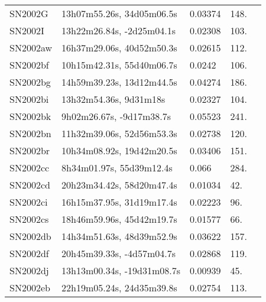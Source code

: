 \begin{longtable}{lllll}
          SN2002G &      13h07m55.26s, 34d05m06.5s &  0.03374 &           148. &    \citet{1995ApJS...99..391H} \\
          SN2002I &      13h22m26.84s, -2d25m04.1s &  0.02308 &           103. &    \citet{2006ApJS..167....1B} \\
         SN2002aw &      16h37m29.06s, 40d52m50.3s &  0.02615 &           112. &    \citet{2002AJ....124.1266R} \\
         SN2002bf &      10h15m42.31s, 55d40m06.7s &   0.0242 &           106. &    \citet{1999PASP..111..438F} \\
         SN2002bg &      14h59m39.23s, 13d12m44.5s &  0.04274 &           186. &    \citet{1996AJ....111..696K} \\
         SN2002bi &         13h32m54.36s, 9d31m18s &  0.02327 &           104. &    \citet{2008AJ....136..713K} \\
         SN2002bk &       9h02m26.67s, -9d17m38.7s &  0.05523 &           241. &    \citet{20096dF...C...0000J} \\
         SN2002bn &      11h32m39.06s, 52d56m53.3s &  0.02738 &           120. &    \citet{1991RC3.9.C...0000d} \\
         SN2002br &      10h34m08.92s, 19d42m20.5s &  0.03406 &           151. &    \citet{2007SDSS6.C...0000:} \\
         SN2002cc &       8h34m01.97s, 55d39m12.4s &    0.066 &           284. &    \citet{2002IAUC.7877C...1M} \\
         SN2002cd &      20h23m34.42s, 58d20m47.4s &  0.01034 &            42. &    \citet{1991RC3.9.C...0000d} \\
         SN2002ci &      16h15m37.95s, 31d19m17.4s &  0.02223 &            96. &    \citet{1997AJ....113.1197H} \\
         SN2002cs &      18h46m59.96s, 45d42m19.7s &  0.01577 &            66. &    \citet{2000AJ....119.1645T} \\
         SN2002db &      14h34m51.63s, 48d39m52.9s &  0.03622 &           157. &    \citet{1999PASP..111..438F} \\
         SN2002df &      20h45m39.33s, -4d57m04.7s &  0.02868 &           119. &    \citet{2002IAUC.7916B...1M} \\
         SN2002dj &     13h13m00.34s, -19d31m08.7s &  0.00939 &            45. &    \citet{2006AJ....131..185R} \\
         SN2002eb &      22h19m05.24s, 24d35m39.8s &  0.02754 &           113. &    \citet{1991RC3.9.C...0000d} \\

\end{longtable}

